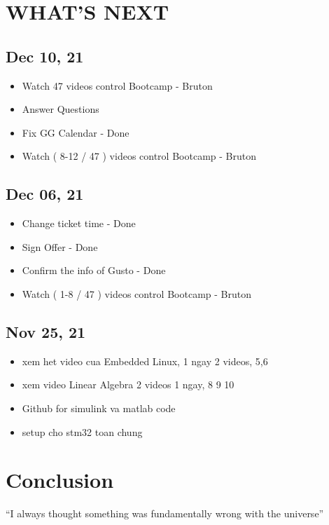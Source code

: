 \documentclass{article}
\begin{document}
\section{WHAT'S NEXT}

\subsection{Dec 10, 21}
\begin{itemize}
  \item Watch 47 videos control Bootcamp - Bruton
  \item Answer Questions
  \item Fix GG Calendar - Done
  \item Watch ( 8-12 / 47 ) videos control Bootcamp - Bruton
\end{itemize}

\subsection{Dec 06, 21}
\begin{itemize}
  \item Change ticket time - Done
  \item Sign Offer - Done
  \item Confirm the info of Gusto - Done
  \item Watch ( 1-8 / 47 ) videos control Bootcamp - Bruton
\end{itemize}

\subsection{Nov 25, 21}
\begin{itemize}
  \item xem het video cua Embedded Linux, 1 ngay 2 videos, 5,6 
  \item xem video Linear Algebra 2 videos 1 ngay, 8 9 10
  \item Github for simulink va matlab code
  \item setup cho stm32 toan chung
\end{itemize}


\section{Conclusion}
``I always thought something was fundamentally wrong with the universe'' \citep{adams1995hitchhiker}

% 
% 
\end{document}
